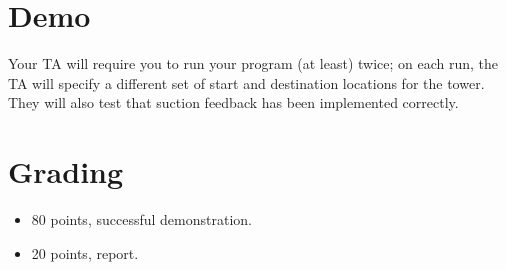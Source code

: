 \section{Demo}

Your TA will require you to run your program (at least) twice; on each run, the TA will specify a different set of start and destination locations for the tower.  They will also test that suction feedback has been implemented correctly.


\section{Grading}
\begin{itemize}
\item 80 points, successful demonstration.
\item 20 points, report.
\end{itemize}
